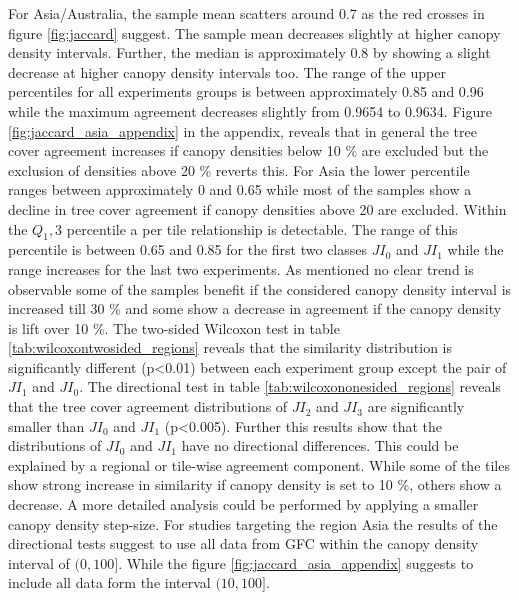 			For Asia/Australia, the sample mean scatters around 0.7 as the red crosses in figure \ref{fig:jaccard} suggest. The sample mean decreases slightly at higher canopy density intervals. Further, the median is approximately 0.8 by showing a slight decrease at higher canopy density intervals too. The range of the upper percentiles for all experiments groups is between approximately 0.85 and 0.96 while the maximum agreement decreases slightly from 0.9654 to 0.9634. Figure \ref{fig:jaccard_asia_appendix} in the appendix, reveals that in general the tree cover agreement increases if canopy densities below 10 \% are excluded but the exclusion of densities above 20 \% reverts this. For Asia the lower percentile ranges between approximately 0 and 0.65 while most of the samples show a decline in tree cover agreement if canopy densities above 20 are excluded. Within the $Q_1,3$ percentile a per tile relationship is detectable. The range of this percentile is between 0.65 and 0.85 for the first two classes $JI_0$ and $JI_1$ while the range increases for the last two experiments. As mentioned no clear trend is observable some of the samples benefit if the considered canopy density interval is increased till 30 \% and some show a decrease in agreement if the canopy density is lift over 10 \%. The two-sided Wilcoxon test in table \ref{tab:wilcoxontwosided_regions} reveals that the similarity distribution is significantly different (p<0.01) between each experiment group except the pair of $JI_1$ and $JI_0$. The directional test in table \ref{tab:wilcoxononesided_regions} reveals that the tree cover agreement distributions of $JI_2$ and $JI_3$ are significantly smaller than $JI_0$ and $JI_1$ (p<0.005). Further this results show that the distributions of $JI_0$ and $JI_1$ have no directional differences. This could be explained by a regional or tile-wise agreement component. While some of the tiles show strong increase in similarity if canopy density is set to 10 \%, others show a decrease. A more detailed analysis could be performed by applying a smaller canopy density step-size. For studies targeting the region Asia the results of the directional tests suggest to use all data from \ac{GFC} within the canopy density interval of $(0,100]$. While the figure \ref{fig:jaccard_asia_appendix} suggests to include all data form the interval $(10,100]$.

